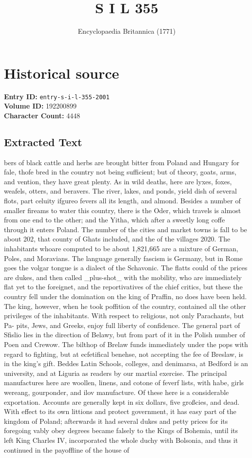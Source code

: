 \documentclass{article}
\title{S I L  355}
\date{Encyclopaedia Britannica (1771)}
\begin{document}
\maketitle

\section*{Historical source}
\textbf{Entry ID:} \texttt{entry-s-i-l-355-2001} \\
\textbf{Volume ID:} 192200899 \\
\textbf{Character Count:} 4448

\subsection*{Extracted Text}
bers of black cattle and herbs are brought bitter from Poland and Hungary for fale, thofe bred in the country not being sufficient; but of theory, goats, arms, and vention, they have great plenty. As in wild deaths, here are lyxes, foxes, weafels, otters, and beravers. The river, lakes, and ponds, yield dish of several flots, part celuity ifgureo fevers all its length, and almond. Besides a number of smaller fireams to water this country, there is the Oder, which travels is almost from one end to the other; and the Yitha, which after a sweetly long coffe through it enters Poland. The number of the cities and market towns is fall to be about 202, that county of Ghats included, and the of the villages 2020. The inhabitants whoare computed to be about 1,821,665 are a mixture of German, Poles, and Moravians. The language generally fascism is Germany, but in Rome goes the volgar tongue is a dialect of the Schavonic. The flatts could of the prices are dukes, and then called \_plus-shot\_ with the mobility, who are immediately flat yet to the foreignet, and the reportivatives of the chief critics, but these the country fell under the domination on the king of Praffin, no does have been held. The king, however, when he took poffition of the country, contained all the other privileges of the inhabitants. With respect to religious, not only Parachants, but Pa- pits, Jews, and Greeks, enjoy full liberty of confidence. The general part of Sfislio lies in the direction of Belawy, but from part of it in the Polish number of Poen and Crewow. The bilthop of Brelaw funds immediately under the pops with regard to fighting, but at ecfetifical benehse, not accepting the fee of Breslaw, is in the king’s gift. Beddes Latin Schools, colleges, and denimarsa, at Bedford is an university, and at Liguria as readers by our martial exercise. The principal manufactures here are woollen, linens, and cotone of feverf lists, with habe, girls wereang, gourponder, and ilov manufacture. Of these here is a considerable exportation. Accounts are generally kept in six dollars, five großcies, and dead. With effect to its own littions and protect government, it has easy part of the kingdom of Poland; afterwards it had several dukes and petty prices for its foregoing vably obey degrees became falsely to the Kings of Bohemia, until its left King Charles IV, incorporated the whole duchy with Bolsonia, and thus it continued in the payoffline of the house of 
\end{document}
